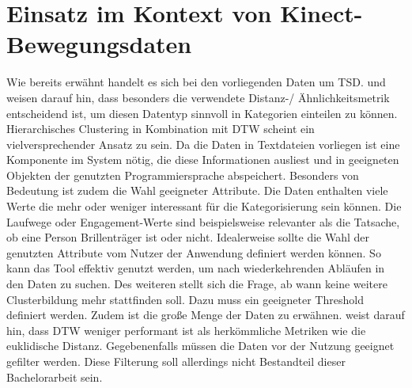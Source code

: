 \section{Einsatz im Kontext von Kinect-Bewegungsdaten}
\label{3-Einsatz}
Wie bereits erwähnt handelt es sich bei den vorliegenden Daten um \ac{TSD}.
\citet{warren_liao_clustering_2005} und \citet{aghabozorgi_time-series_2015} weisen darauf hin,
dass besonders die verwendete Distanz-/ Ähnlichkeitsmetrik entscheidend ist,
um diesen Datentyp sinnvoll in Kategorien einteilen zu können.
Hierarchisches Clustering in Kombination mit \ac{DTW} scheint ein vielversprechender Ansatz zu sein.
Da die Daten in Textdateien vorliegen ist eine Komponente im System nötig,
die diese Informationen ausliest und in geeigneten Objekten der genutzten Programmiersprache abspeichert.
Besonders von Bedeutung ist zudem die Wahl geeigneter Attribute.
Die Daten enthalten viele Werte die mehr oder weniger interessant für die Kategorisierung sein können.
Die Laufwege oder Engagement-Werte sind beispielsweise relevanter als die Tatsache,
ob eine Person Brillenträger ist oder nicht.
Idealerweise sollte die Wahl der genutzten Attribute vom Nutzer der Anwendung definiert werden können.
So kann das Tool effektiv genutzt werden, um nach wiederkehrenden Abläufen in den Daten zu suchen.
Des weiteren stellt sich die Frage, ab wann keine weitere Clusterbildung mehr stattfinden soll.
Dazu muss ein geeigneter Threshold definiert werden.
Zudem ist die große Menge der Daten zu erwähnen.
\citet{aghabozorgi_time-series_2015} weist darauf hin,
dass \ac{DTW} weniger performant ist als herkömmliche Metriken wie die euklidische Distanz.
Gegebenenfalls müssen die Daten vor der Nutzung geeignet gefilter werden.
Diese Filterung soll allerdings nicht Bestandteil dieser Bachelorarbeit sein.
